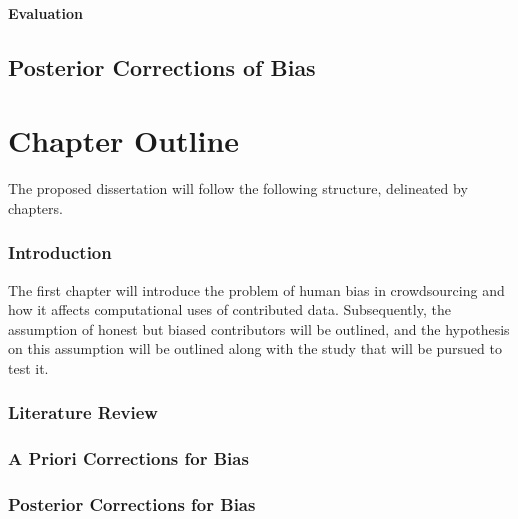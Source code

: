 \paragraph{Evaluation}\label{evaluation}

\subsection{Posterior Corrections of
Bias}\label{posterior-corrections-of-bias}

\section{Chapter Outline}\label{chapter-outline}

The proposed dissertation will follow the following structure,
delineated by chapters.

\subsubsection{Introduction}\label{introduction-3}

The first chapter will introduce the problem of human bias in
crowdsourcing and how it affects computational uses of contributed data.
Subsequently, the assumption of honest but biased contributors will be
outlined, and the hypothesis on this assumption will be outlined along
with the study that will be pursued to test it.

\subsubsection{Literature Review}\label{literature-review}

\subsubsection{A Priori Corrections for
Bias}\label{a-priori-corrections-for-bias}

\subsubsection{Posterior Corrections for
Bias}\label{posterior-corrections-for-bias}
